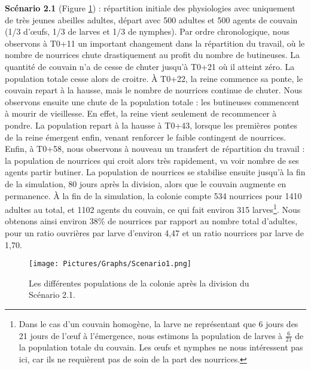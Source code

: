 		\textbf{Scénario 2.1} (Figure \ref{sc1}) : répartition initiale des physiologies avec uniquement de très jeunes abeilles adultes, départ avec 500 adultes et 500 agents de couvain (1/3 d'œufs, 1/3 de larves et 1/3 de nymphes). Par ordre chronologique, nous observons à T0+11 un important changement dans la répartition du travail, où le nombre de nourrices chute drastiquement au profit du nombre de butineuses. La quantité de couvain n'a de cesse de chuter jusqu'à T0+21 où il atteint zéro. La population totale cesse alors de croitre. À T0+22, la reine commence sa ponte, le couvain repart à la hausse, mais le nombre de nourrices continue de chuter. Nous observons ensuite une chute de la population totale : les butineuses commencent à mourir de vieillesse. En effet, la reine vient seulement de recommencer à pondre. La population repart à la hausse à T0+43, lorsque les premières pontes de la reine émergent enfin, venant renforcer le faible contingent de nourrices. Enfin, à T0+58, nous observons à nouveau un transfert de répartition du travail : la population de nourrices qui croit alors très rapidement, va voir nombre de ses agents partir butiner. La population de nourrices se stabilise ensuite jusqu'à la fin de la simulation, 80 jours après la division, alors que le couvain augmente en permanence. À la fin de la simulation, la colonie compte 534 nourrices pour 1410 adultes au total, et 1102 agents du couvain, ce qui fait environ 315 larves\footnote{\label{footCalculLarves} Dans le cas d'un couvain homogène, la larve ne représentant que 6 jours des 21 jours de l'œuf à l'émergence, nous estimons la population de larves à $\frac{6}{21}$ de la population totale du couvain. Les œufs et nymphes ne nous intéressent pas ici, car ils ne requièrent pas de soin de la part des nourrices.}. Nous obtenons ainsi environ 38\% de nourrices par rapport au nombre total d'adultes, pour un ratio ouvrières par larve d'environ 4,47 et un ratio nourrices par larve de 1,70.
	
	\begin{figure}
	\centering
	\texttt{[image: Pictures/Graphs/Scenario1.png]}
	\caption{Les différentes populations de la colonie après la division du Scénario 2.1.}
	\label{sc1}
	\end{figure}
		
